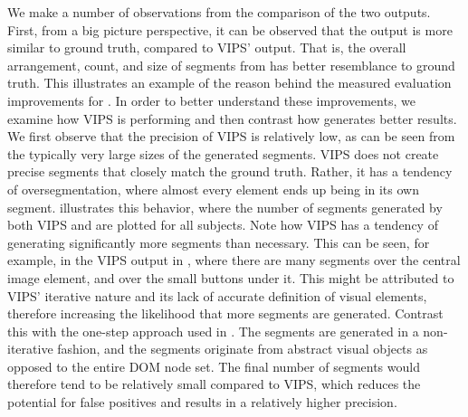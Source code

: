 We make a number of observations
from the comparison of the two outputs.
First, from a big picture perspective,
it can be observed that the \toolname
output is more similar to ground truth,
compared to VIPS' output.
That is, the overall arrangement, count, and size of segments
from \toolname has better resemblance to ground truth.
This illustrates an example of the reason behind the measured
evaluation improvements for \toolname.
In order to better understand these improvements, we 
examine how VIPS is performing 
and then contrast how \toolname generates better results.
We first observe that the precision of VIPS is relatively low,
as can be seen from the typically very large sizes of the generated segments.
VIPS does not create precise segments that closely match the ground truth.
Rather, it has a tendency of oversegmentation, where almost
every element ends up being in its own segment.
 illustrates this behavior,
where the number of segments generated by both VIPS and \toolname
are plotted for all subjects. Note how VIPS has a tendency of generating
significantly more segments than necessary.
This can be seen, for example, in the VIPS output in ,
where there are many segments over the central image element,
and over the small buttons under it.
This might be attributed to VIPS' iterative nature
and its lack of accurate definition of visual elements,
therefore increasing the likelihood that more segments are generated.
Contrast this with the one-step approach used in \toolname.
The segments are generated in a non-iterative fashion,
and the segments originate from abstract visual objects as opposed to 
the entire DOM node set.
The final number of segments would therefore tend 
to be relatively small compared to VIPS,
which reduces the potential for false positives
and results in a relatively higher precision.

